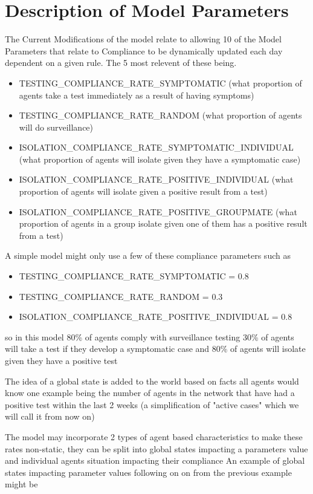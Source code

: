 \documentclass{article}
\begin{document}
\section{Description of Model Parameters}
The Current Modifications of the model relate to allowing 10 of the Model Parameters that relate to Compliance to be dynamically updated each day dependent on a given rule. The 5 most relevent of these being.
\begin{itemize}
\item TESTING\_COMPLIANCE\_RATE\_SYMPTOMATIC (what proportion of agents take a test immediately as a result of having symptoms)
\item TESTING\_COMPLIANCE\_RATE\_RANDOM  (what proportion of agents will do surveillance)
\item ISOLATION\_COMPLIANCE\_RATE\_SYMPTOMATIC\_INDIVIDUAL (what proportion of agents will isolate given they have a symptomatic case)
\item ISOLATION\_COMPLIANCE\_RATE\_POSITIVE\_INDIVIDUAL (what proportion of agents will isolate given a positive result from a test)
\item ISOLATION\_COMPLIANCE\_RATE\_POSITIVE\_GROUPMATE (what proportion of agents in a group isolate given one of them has a positive result from a test)
\end{itemize}

A simple model might only use a few of these compliance parameters such as 
\begin{itemize}
\item TESTING\_COMPLIANCE\_RATE\_SYMPTOMATIC = 0.8\
\item TESTING\_COMPLIANCE\_RATE\_RANDOM = 0.3
\item ISOLATION\_COMPLIANCE\_RATE\_POSITIVE\_INDIVIDUAL = 0.8
\end{itemize}

so in this model 80\% of agents comply with surveillance testing 
30\% of agents will take a test if they develop a symptomatic case and 80\% of agents will isolate given they have a positive test

The idea of a global state is added to the world based on facts all agents would know one example being the number of agents in the network that have had a positive test within the last 2 weeks (a simplification of "active cases" which we will call it from now on)

The model may incorporate 2 types of agent based characteristics to make these rates non-static, they can be split into global states impacting a parameters value and individual agents situation impacting their compliance 
An example of global states impacting parameter values following on on from the previous example might be
\end{document}
